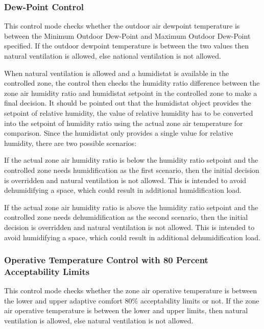 \subsubsection{Dew-Point Control}\label{dew-point-control}

This control mode checks whether the outdoor air dewpoint temperature is between the Minimum Outdoor Dew-Point and Maximum Outdoor Dew-Point specified. If the outdoor dewpoint temperature is between the two values then natural ventilation is allowed, else national ventilation is not allowed.

When natural ventilation is allowed and a humidistat is available in the controlled zone, the control then checks the humidity ratio difference between the zone air humidity ratio and humidistat setpoint in the controlled zone to make a final decision. It should be pointed out that the humidistat object provides the setpoint of relative humidity, the value of relative humidity has to be converted into the setpoint of humidity ratio using the actual zone air temperature for comparison. Since the humidistat only provides a single value for relative humidity, there are two possible scenarios:

If the actual zone air humidity ratio is below the humidity ratio setpoint and the controlled zone needs humidification as the first scenario, then the initial decision is overridden and natural ventilation is not allowed. This is intended to avoid dehumidifying a space, which could result in additional humidification load.

If the actual zone air humidity ratio is above the humidity ratio setpoint and the controlled zone needs dehumidification as the second scenario, then the initial decision is overridden and natural ventilation is not allowed. This is intended to avoid humidifying a space, which could result in additional dehumidification load.

\subsubsection{Operative Temperature Control with 80 Percent Acceptability Limits}\label{operative-temperature-control-with-80-acceptability-limits}

 This control mode checks whether the zone air operative temperature is between the lower and upper adaptive comfort 80\% acceptability limits or not. If the zone air operative temperature is between the lower and upper limits, then natural ventilation is allowed, else natural ventilation is not allowed. 

